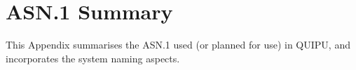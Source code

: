 \chapter {ASN.1 Summary}

This Appendix summarises the ASN.1 used (or planned for use) in QUIPU, and
incorporates the system naming aspects.

